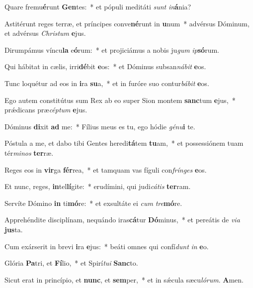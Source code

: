 \item Quare fremu\textbf{é}runt \textbf{Gen}tes:~* et pópuli meditáti \textit{sunt} \textit{in}\textbf{á}nia?
\item Astitérunt reges terræ, et príncipes conve\textbf{né}runt in \textbf{u}num~* advérsus Dóminum, et advérsus \textit{Chris}\textit{tum} \textbf{e}jus.
\item Dirumpámus víncu\textbf{la} e\textbf{ó}rum:~* et projiciámus a nobis ju\textit{gum} \textit{ip}\textbf{só}rum.
\item Qui hábitat in cælis, irri\textbf{dé}bit \textbf{e}os:~* et Dóminus subsan\textit{ná}\textit{bit} \textbf{e}os.
\item Tunc loquétur ad eos in \textbf{i}ra \textbf{su}a,~* et in furóre suo contur\textit{bá}\textit{bit} \textbf{e}os.
\item Ego autem constitútus sum Rex ab eo super Sion montem \textbf{sanc}tum \textbf{e}jus,~* prǽdicans præ\textit{cép}\textit{tum} \textbf{e}jus.
\item Dóminus \textbf{di}xit \textbf{ad} me:~* Fílius meus es tu, ego hódie \textit{gé}\textit{nu}\textbf{i} te.
\item Póstula a me, et dabo tibi Gentes heredi\textbf{tá}tem \textbf{tu}am,~* et possessiónem tuam tér\textit{mi}\textit{nos} \textbf{ter}ræ.
\item Reges eos in \textbf{vir}ga \textbf{fér}rea,~* et tamquam vas fíguli con\textit{frín}\textit{ges} \textbf{e}os.
\item Et nunc, reges, \textbf{in}tel\textbf{lí}gite:~* erudímini, qui judi\textit{cá}\textit{tis} \textbf{ter}ram.
\item Servíte Dómino \textbf{in} ti\textbf{mó}re:~* et exsultáte ei \textit{cum} \textit{tre}\textbf{mó}re.
\item Apprehéndite disciplínam, nequándo iras\textbf{cá}tur \textbf{Dó}minus,~* et pereátis de \textit{vi}\textit{a} \textbf{jus}ta.
\item Cum exárserit in brevi \textbf{i}ra \textbf{e}jus:~* beáti omnes qui confí\textit{dunt} \textit{in} \textbf{e}o.
\item Glória \textbf{Pa}tri, et \textbf{Fí}lio,~* et Spirí\textit{tu}\textit{i} \textbf{Sanc}to.
\item Sicut erat in princípio, et \textbf{nunc}, et \textbf{sem}per,~* et in sǽcula sæcu\textit{ló}\textit{rum}. \textbf{A}men.
